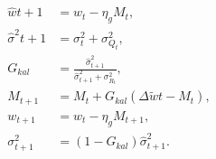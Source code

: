 
\vspace{-5mm}
\begin{subequations}
   \begin{align}
   \hat{w}{t+1}&=w_t-\eta_g M_t,\label{step:pre_w}\\
   \hat{\sigma}^2{t+1}&={\sigma}^2_t+\sigma^2_{Q_t},\label{step:pre_s}\\
   G_{kal}&=\frac{\hat{\sigma}^2_{t+1}}{\hat{\sigma}^2_{t+1}+\sigma^2_{R_t}},\label{step:G_kal}\\
   M_{t+1}&= M_t+G_{kal}(\Delta \tilde{w}t-M_t),\label{step:M}\\
   w_{t+1}&=w_t-\eta_g M_{t+1},\label{eq:update}\\
   {\sigma}^2_{t+1}&=(1-G_{kal})\hat{\sigma}^2_{t+1}.\label{eq:sigma}
   \end{align}
\end{subequations}
